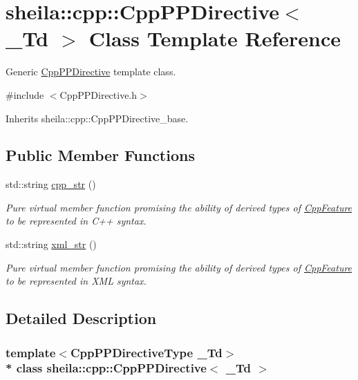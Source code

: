 \hypertarget{classsheila_1_1cpp_1_1CppPPDirective}{}\section{sheila\+:\+:cpp\+:\+:Cpp\+P\+P\+Directive$<$ \+\_\+\+Td $>$ Class Template Reference}
\label{classsheila_1_1cpp_1_1CppPPDirective}


Generic \hyperlink{classsheila_1_1cpp_1_1CppPPDirective}{Cpp\+P\+P\+Directive} template class.  




{\ttfamily \#include $<$Cpp\+P\+P\+Directive.\+h$>$}



Inherits sheila\+::cpp\+::\+Cpp\+P\+P\+Directive\+\_\+base.

\subsection*{Public Member Functions}
\begin{DoxyCompactItemize}
\item 
std\+::string \hyperlink{classsheila_1_1cpp_1_1CppPPDirective_a5e99d12647c03da25f05fdb8f69ce207}{cpp\+\_\+str} ()
\begin{DoxyCompactList}\small\item\em Pure virtual member function promising the ability of derived types of {\ttfamily \hyperlink{classsheila_1_1cpp_1_1CppFeature}{Cpp\+Feature}} to be represented in C++ syntax. \end{DoxyCompactList}\item 
std\+::string \hyperlink{classsheila_1_1cpp_1_1CppPPDirective_ab3c20665d4ad7c66b9085175c084623e}{xml\+\_\+str} ()
\begin{DoxyCompactList}\small\item\em Pure virtual member function promising the ability of derived types of {\ttfamily \hyperlink{classsheila_1_1cpp_1_1CppFeature}{Cpp\+Feature}} to be represented in X\+ML syntax. \end{DoxyCompactList}\end{DoxyCompactItemize}


\subsection{Detailed Description}
\subsubsection*{template$<$Cpp\+P\+P\+Directive\+Type \+\_\+\+Td$>$\\*
class sheila\+::cpp\+::\+Cpp\+P\+P\+Directive$<$ \+\_\+\+Td $>$}

